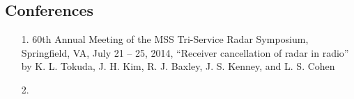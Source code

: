 \documentclass[11pt,onecolumn]{IEEEtran}
\begin{document}
\subsection{Conferences}
\begin{enumerate}
\item[1.]
60th Annual Meeting of the MSS Tri-Service Radar Symposium, Springfield, VA, July 21 -- 25, 2014, ``Receiver cancellation of radar in radio'' by K. L. Tokuda, J. H. Kim, R. J.  Baxley, J. S.  Kenney, and L. S. Cohen
\item[2.]
\end{enumerate}



\end{document}
